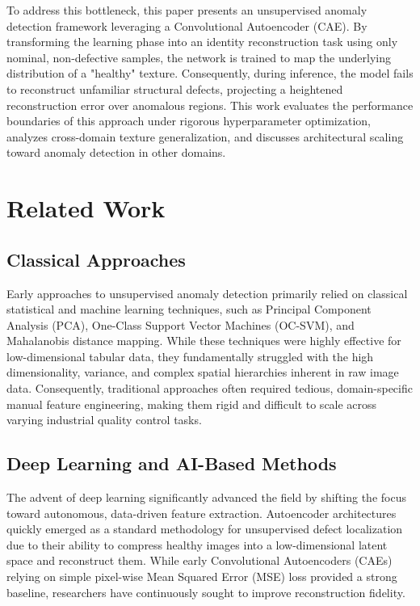 \documentclass[10pt,twocolumn,a4paper]{article}
\begin{document}
To address this bottleneck, this paper presents an unsupervised anomaly detection framework leveraging a Convolutional Autoencoder (CAE). By transforming the learning phase into an identity reconstruction task using only nominal, non-defective samples, the network is trained to map the underlying distribution of a "healthy" texture. Consequently, during inference, the model fails to reconstruct unfamiliar structural defects, projecting a heightened reconstruction error over anomalous regions. This work evaluates the performance boundaries of this approach under rigorous hyperparameter optimization, analyzes cross-domain texture generalization, and discusses architectural scaling toward anomaly detection in other domains.
	
	\section{Related Work}

\subsection{Classical Approaches}
Early approaches to unsupervised anomaly detection primarily relied on classical statistical and machine learning techniques, such as Principal Component Analysis (PCA), One-Class Support Vector Machines (OC-SVM), and Mahalanobis distance mapping. While these techniques were highly effective for low-dimensional tabular data, they fundamentally struggled with the high dimensionality, variance, and complex spatial hierarchies inherent in raw image data. Consequently, traditional approaches often required tedious, domain-specific manual feature engineering, making them rigid and difficult to scale across varying industrial quality control tasks.

\subsection{Deep Learning and AI-Based Methods}
The advent of deep learning significantly advanced the field by shifting the focus toward autonomous, data-driven feature extraction. Autoencoder architectures quickly emerged as a standard methodology for unsupervised defect localization due to their ability to compress healthy images into a low-dimensional latent space and reconstruct them. While early Convolutional Autoencoders (CAEs) relying on simple pixel-wise Mean Squared Error (MSE) loss provided a strong baseline, researchers have continuously sought to improve reconstruction fidelity. 
\end{document}
